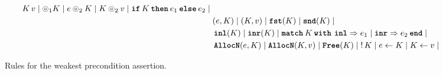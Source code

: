 \documentclass[thesis.tex]{subfiles}
\begin{document}
\begin{figure}[th!]
\begin{align*}
        \lctx\, \val \mid
        \HLOp_1 \lctx \mid
        \expr \HLOp_2 \lctx \mid
        \lctx \HLOp_2 \val \mid
        \If \lctx then \expr_1 \Else \expr_2 \mid
        {}                          \\ &
        (\expr, \lctx) \mid
        (\lctx, \val) \mid
        \Fst(\lctx) \mid
        \Snd(\lctx) \mid
        {}                          \\ &
        \Inl(\lctx) \mid
        \Inr(\lctx) \mid
        \Match \lctx with \Inl => \expr_1 | \Inr => \expr_2 end \mid
        {}                          \\ &
        \AllocN(\expr, \lctx) \mid
        \AllocN(\lctx, \val) \mid
        \Free(\lctx) \mid
        \deref \lctx \mid
        \expr \gets \lctx \mid
        \lctx \gets \val \mid
    \end{align*}
    \caption{Rules for the weakest precondition assertion.}
    \label{fig:wp-rules}
\end{figure}
\end{document}
